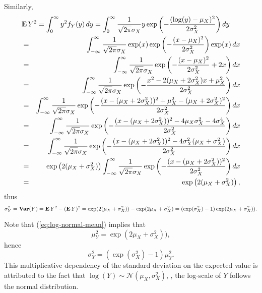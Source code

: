 \documentclass[10pt, twoside]{book}   	%
\begin{document}
Similarly,
\begin{eqnarray*}
\lefteqn{
\Expect Y^2 = \int_{0}^{\infty} y^2 f_Y(y) \, dy
= \int_{0}^{\infty} \frac{1}{\sqrt{2\pi} \sigma_X }  y \exp\left(-\frac{(\log(y)-\mu_X)^2}{2\sigma_X^2}\right) dy
}
\\
&=&
\int_{-\infty}^{\infty} \frac{1}{\sqrt{2\pi} \sigma_X }  \exp(x) \exp\left(-\frac{(x-\mu_X)^2}{2\sigma_X^2}\right) \exp(x) \, dx
\\
&=&
\int_{-\infty}^{\infty} \frac{1}{\sqrt{2\pi} \sigma_X }  \exp\left(-\frac{(x-\mu_X)^2}{2\sigma_X^2}+2x\right) dx
\\
&=&
\int_{-\infty}^{\infty} \frac{1}{\sqrt{2\pi} \sigma_X }  \exp\left(-\frac{x^2 - 2(\mu_X +2\sigma_X^2)x + \mu_X^2}{2\sigma_X^2}\right) dx
\\
&=&
\int_{-\infty}^{\infty} \frac{1}{\sqrt{2\pi} \sigma_X }  \exp\left(-\frac{(x - (\mu_X +2\sigma_X^2))^2 + \mu_X^2 -(\mu_X+2\sigma_X^2)^2}{2\sigma_X^2}\right) dx
\\
&=&
\int_{-\infty}^{\infty} \frac{1}{\sqrt{2\pi} \sigma_X }  \exp\left(-\frac{(x - (\mu_X +2\sigma_X^2))^2 - 4\mu_X\sigma_X^2 - 4\sigma_X^4}{2\sigma_X^2}\right) dx
\\
&=&
\int_{-\infty}^{\infty} \frac{1}{\sqrt{2\pi} \sigma_X }  \exp\left(-\frac{(x - (\mu_X +2\sigma_X^2))^2 - 4\sigma_X^2(\mu_X+ \sigma_X^2)}{2\sigma_X^2}\right) dx
\\
&=&
\exp\left({2(\mu_X+ \sigma_X^2)}\right)
\int_{-\infty}^{\infty} \frac{1}{\sqrt{2\pi} \sigma_X }  \exp\left(-\frac{(x - (\mu_X +2\sigma_X^2))^2 }{2\sigma_X^2}\right) dx
\\
&=&
\exp\left({2(\mu_X+ \sigma_X^2)}\right),
\end{eqnarray*}
thus
\begin{equation}
\label{eq:log-normal-var}
\sigma_Y^2 =
\mathop{\bf Var{}}(Y) = \mathop{\bf E{}} Y^2 - (\mathop{\bf E{}} Y)^2 = \exp(2(\mu_X+\sigma_X^2)) - \exp(2\mu_X+\sigma_X^2)
= (\exp(\sigma_X^2)-1) \exp(2\mu_X+\sigma_X^2)).
\end{equation}

Note that (\ref{eq:log-normal-mean}) implies that
\begin{equation}
\mu_Y^2
= \exp(2\mu_X+\sigma_X^2)),
\end{equation}
hence
\begin{equation}
\sigma_Y^2
= (\exp(\sigma_X^2)-1) \mu_Y^2.
\end{equation}
This multiplicative dependency of the standard deviation on the expected value
is attributed to the fact that $\log(Y) \sim \mathcal{N}(\mu_X,\sigma_X^2)$,
\ie,
the log-scale of $Y$ follows the normal distribution.
\end{document}

